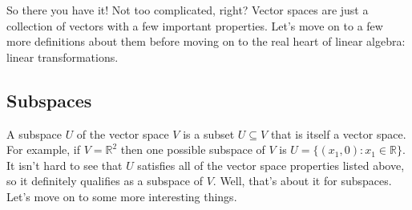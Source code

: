 \documentclass[12pt]{article}
\begin{document}
So there you have it! Not too complicated, right? Vector spaces are just a collection of vectors with a few important properties. Let's move on to a few more definitions about them before moving on to the real heart of linear algebra:  linear transformations.

\subsection*{Subspaces}

A subspace $U$ of the vector space $V$ is a subset $U \subseteq V$ that is itself a vector space. For example, if $V = \mathbb{R}^2$ then one possible subspace of $V$ is $U = \{ (x_1, 0) : x_1 \in \mathbb{R} \}$. It isn't hard to see that $U$ satisfies all of the vector space properties listed above, so it definitely qualifies as a subspace of $V$. Well, that's about it for subspaces. Let's move on to some more interesting things.
\end{document}
